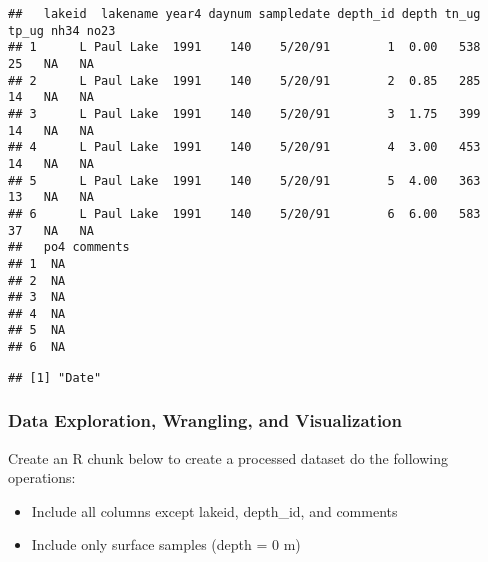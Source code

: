 \documentclass[]{article}
\newenvironment{Shaded}{\begin{snugshade}}{\end{snugshade}}
\newcommand{\CommentTok}[1]{\textcolor[rgb]{0.56,0.35,0.01}{\textit{#1}}}
\newcommand{\DataTypeTok}[1]{\textcolor[rgb]{0.13,0.29,0.53}{#1}}
\newcommand{\DecValTok}[1]{\textcolor[rgb]{0.00,0.00,0.81}{#1}}
\newcommand{\KeywordTok}[1]{\textcolor[rgb]{0.13,0.29,0.53}{\textbf{#1}}}
\newcommand{\NormalTok}[1]{#1}
\newcommand{\OperatorTok}[1]{\textcolor[rgb]{0.81,0.36,0.00}{\textbf{#1}}}
\newcommand{\StringTok}[1]{\textcolor[rgb]{0.31,0.60,0.02}{#1}}
\providecommand{\tightlist}{%
  \setlength{\itemsep}{0pt}\setlength{\parskip}{0pt}}
\begin{document}
\begin{verbatim}
##   lakeid  lakename year4 daynum sampledate depth_id depth tn_ug tp_ug nh34 no23
## 1      L Paul Lake  1991    140    5/20/91        1  0.00   538    25   NA   NA
## 2      L Paul Lake  1991    140    5/20/91        2  0.85   285    14   NA   NA
## 3      L Paul Lake  1991    140    5/20/91        3  1.75   399    14   NA   NA
## 4      L Paul Lake  1991    140    5/20/91        4  3.00   453    14   NA   NA
## 5      L Paul Lake  1991    140    5/20/91        5  4.00   363    13   NA   NA
## 6      L Paul Lake  1991    140    5/20/91        6  6.00   583    37   NA   NA
##   po4 comments
## 1  NA         
## 2  NA         
## 3  NA         
## 4  NA         
## 5  NA         
## 6  NA
\end{verbatim}

\begin{Shaded}
\end{Shaded}

\begin{verbatim}
## [1] "Date"
\end{verbatim}

\hypertarget{data-exploration-wrangling-and-visualization}{%
\subsubsection{Data Exploration, Wrangling, and
Visualization}\label{data-exploration-wrangling-and-visualization}}

Create an R chunk below to create a processed dataset do the following
operations:

\begin{itemize}
\tightlist
\item
  Include all columns except lakeid, depth\_id, and comments
\item
  Include only surface samples (depth = 0 m)
\end{itemize}

\begin{Shaded}
\end{Shaded}
\end{document}
